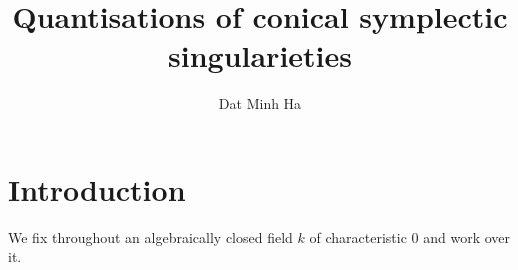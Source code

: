 

\setcounter{section}{-1}





    \title{Quantisations of conical symplectic singularieties}
    
    \author{Dat Minh Ha}
    \maketitle
    
    \begin{abstract}
        
    \end{abstract}
    
    {
      \hypersetup{} 
      \tableofcontents %
    }

    \section{Introduction}
        \begin{convention}
            We fix throughout an algebraically closed field $k$ of characteristic $0$ and work over it. 
        \end{convention}

